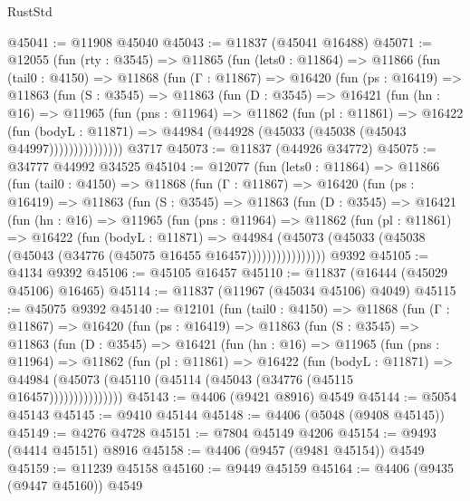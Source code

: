 \begin{lexlean}{RustStd}
\begin{coremodule}
{\begin{coremodule}
{{{{{{{{{{{{{{{{{{{{{{{{{{{{{{{{{{{{{{{{{{{{{{{{{{@45041 := @11908 @45040
@45043 := @11837 (@45041 @16488)
@45071 := @12055
    (fun (rty : @3545) =>
    @11865
      (fun (lets0 : @11864) =>
      @11866
        (fun (tail0 : @4150) =>
        @11868
          (fun (Γ : @11867) =>
          @16420
            (fun (ps : @16419) =>
            @11863
              (fun (S : @3545) =>
              @11863
                (fun (D : @3545) =>
                @16421
                  (fun (hn : @16) =>
                  @11965
                    (fun (pns : @11964) =>
                    @11862
                      (fun (pl : @11861) =>
                      @16422
                        (fun (bodyL : @11871) =>
                        @44984 (@44928 (@45033 (@45038 (@45043 @44997)))))))))))))))
    @3717
@45073 := @11837 (@44926 @34772)
@45075 := @34777 @44992 @34525
@45104 := @12077
    (fun (lets0 : @11864) =>
    @11866
      (fun (tail0 : @4150) =>
      @11868
        (fun (Γ : @11867) =>
        @16420
          (fun (ps : @16419) =>
          @11863
            (fun (S : @3545) =>
            @11863
              (fun (D : @3545) =>
              @16421
                (fun (hn : @16) =>
                @11965
                  (fun (pns : @11964) =>
                  @11862
                    (fun (pl : @11861) =>
                    @16422
                      (fun (bodyL : @11871) =>
                      @44984
                        (@45073
                          (@45033 (@45038 (@45043 (@34776 (@45075 @16455 @16457))))))))))))))))
    @9392
@45105 := @4134 @9392
@45106 := @45105 @16457
@45110 := @11837 (@16444 (@45029 @45106) @16465)
@45114 := @11837 (@11967 (@45034 @45106) @4049)
@45115 := @45075 @9392
@45140 := @12101
    (fun (tail0 : @4150) =>
    @11868
      (fun (Γ : @11867) =>
      @16420
        (fun (ps : @16419) =>
        @11863
          (fun (S : @3545) =>
          @11863
            (fun (D : @3545) =>
            @16421
              (fun (hn : @16) =>
              @11965
                (fun (pns : @11964) =>
                @11862
                  (fun (pl : @11861) =>
                  @16422
                    (fun (bodyL : @11871) =>
                    @44984 (@45073 (@45110 (@45114 (@45043 (@34776 (@45115 @16457)))))))))))))))
@45143 := @4406 (@9421 @8916) @4549
@45144 := @5054 @45143
@45145 := @9410 @45144
@45148 := @4406 (@5048 (@9408 @45145))
@45149 := @4276 @4728
@45151 := @7804 @45149 @4206
@45154 := @9493 (@4414 @45151) @8916
@45158 := @4406 (@9457 (@9481 @45154)) @4549
@45159 := @11239 @45158
@45160 := @9449 @45159
@45164 := @4406 (@9435 (@9447 @45160)) @4549
}}}}}}}}}}}}}}}}}}}}}}}}}}}}}}}}}}}}}}}}}}}}}}}}}}
\end{coremodule}}
\end{coremodule}
\end{lexlean}
